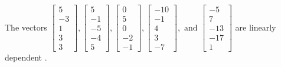 \begin{exercise}
\begin{exerciseStatement}
  \end{exerciseStatement}
  \begin{exerciseAnswer}
   The vectors \(\left[\begin{array}{r}
5 \\
-3 \\
1 \\
3 \\
3
\end{array}\right] , \left[\begin{array}{r}
5 \\
-1 \\
-5 \\
-4 \\
5
\end{array}\right] , \left[\begin{array}{r}
0 \\
5 \\
0 \\
-2 \\
-1
\end{array}\right] , \left[\begin{array}{r}
-10 \\
-1 \\
4 \\
3 \\
-7
\end{array}\right] , \text{ and } \left[\begin{array}{r}
-5 \\
7 \\
-13 \\
-17 \\
1
\end{array}\right]\) are 
  	 linearly dependent  .
  


  \end{exerciseAnswer}
\end{exercise}